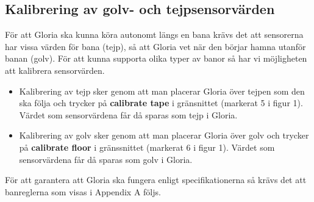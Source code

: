 \subsection{Kalibrering av golv- och tejpsensorvärden}
	För att Gloria ska kunna köra autonomt längs en bana krävs det att sensorerna har vissa värden för bana (tejp), så att Gloria vet när den börjar hamna utanför banan (golv). För att kunna supporta olika typer av banor så har vi möjligheten att kalibrera sensorvärden.
\begin{itemize}
	\item Kalibrering av tejp sker genom att man placerar Gloria över tejpen som den ska följa och trycker på \textbf{calibrate tape} i gränsnittet (markerat 5 i figur 1). Värdet som sensorvärdena får då sparas som tejp i Gloria.
	\item Kalibrering av golv sker genom att man placerar Gloria över golv och trycker på \textbf{calibrate floor} i gränssnittet (markerat 6 i figur 1). Värdet som sensorvärdena får då sparas som golv i Gloria.
\end{itemize}
För att garantera att Gloria ska fungera enligt specifikationerna så krävs det att banreglerna som visas i Appendix A följs.
